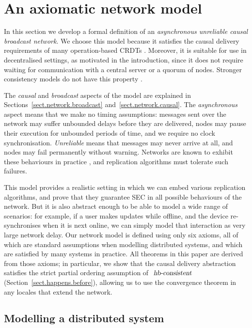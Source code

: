 \section{An axiomatic network model}
\label{sect.network}

In this section we develop a formal definition of an \emph{asynchronous unreliable causal broadcast network}.
We choose this model because it satisfies the causal delivery requirements of many operation-based CRDTs \cite{Almeida:2015fc,Baquero:2014ed}.
Moreover, it is suitable for use in decentralised settings, as motivated in the introduction, since it does not require waiting for communication with a central server or a quorum of nodes.
Stronger consistency models do not have this property \cite{Attiya:2015dm,Davidson:1985hv}.

The \emph{causal} and \emph{broadcast} aspects of the model are explained in Sections~\ref{sect.network.broadcast} and~\ref{sect.network.causal}.
The \emph{asynchronous} aspect means that we make no timing assumptions: messages sent over the network may suffer unbounded delays before they are delivered, nodes may pause their execution for unbounded periods of time, and we require no clock synchronisation.
\emph{Unreliable} means that messages may never arrive at all, and nodes may fail permanently without warning.
Networks are known to exhibit these behaviours in practice \cite{Bailis:2014jx}, and replication algorithms must tolerate such failures.

This model provides a realistic setting in which we can embed various replication algorithms, and prove that they guarantee SEC in all possible behaviours of the network.
But it is also abstract enough to be able to model a wide range of scenarios: for example, if a user makes updates while offline, and the device re-synchronises when it is next online, we can simply model that interaction as very large network delay.
Our network model is defined using only six axioms, all of which are standard assumptions when modelling distributed systems, and which are satisfied by many systems in practice.
All theorems in this paper are derived from those axioms; in particular, we show that the causal delivery abstraction satisfies the strict partial ordering assumption of $\isa{hb-consistent}$ (Section~\ref{sect.happens.before}), allowing us to use the convergence theorem in any locales that extend the network.

\subsection{Modelling a distributed system}

